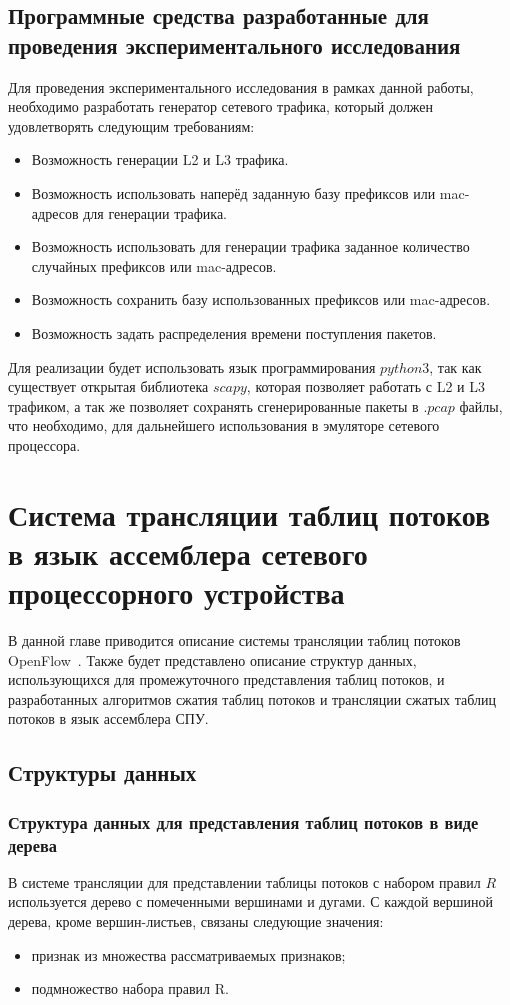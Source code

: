 \documentclass[a4paper, 12pt, titlepage, finall]{extreport}
\begin{document}
        \section{Программные средства разработанные для проведения экспериментального исследования}
            Для проведения экспериментального исследования в рамках данной работы, необходимо разработать генератор сетевого трафика, который должен удовлетворять следующим требованиям:
            \begin{itemize}
                \item Возможность генерации L2 и L3 трафика.
                \item Возможность использовать наперёд заданную базу префиксов или mac-адресов для генерации трафика.
                \item Возможность использовать для генерации трафика заданное количество случайных префиксов или mac-адресов.
                \item Возможность сохранить базу использованных префиксов или mac-адресов.
                \item Возможность задать распределения времени поступления пакетов.
            \end{itemize}
            Для реализации будет использовать язык программирования $python3$, так как существует открытая библиотека $scapy$, которая позволяет работать с L2 и L3 трафиком,
            а так же позволяет сохранять сгенерированные пакеты в $.pcap$ файлы, что необходимо, для дальнейшего использования в эмуляторе сетевого процессора.
    \chapter{Система трансляции таблиц потоков в язык ассемблера сетевого процессорного устройства}
        В данной главе приводится описание системы трансляции таблиц потоков OpenFlow~\cite{andrewmonetec}. Также будет представлено описание
        структур данных, использующихся для промежуточного представления таблиц потоков, и разработанных алгоритмов сжатия таблиц потоков и трансляции
        сжатых таблиц потоков в язык ассемблера СПУ.
        \section {Структуры данных}
            \subsection {Структура данных для представления таблиц потоков в виде дерева}
                В системе трансляции для представлении таблицы потоков с набором правил \(R\) используется дерево с помеченными вершинами и дугами.
                С каждой вершиной дерева, кроме вершин-листьев, связаны следующие значения:
                \begin{itemize}
                    \item признак из множества рассматриваемых признаков;
                    \item подмножество набора правил R.
                \end{itemize}
\end{document}
